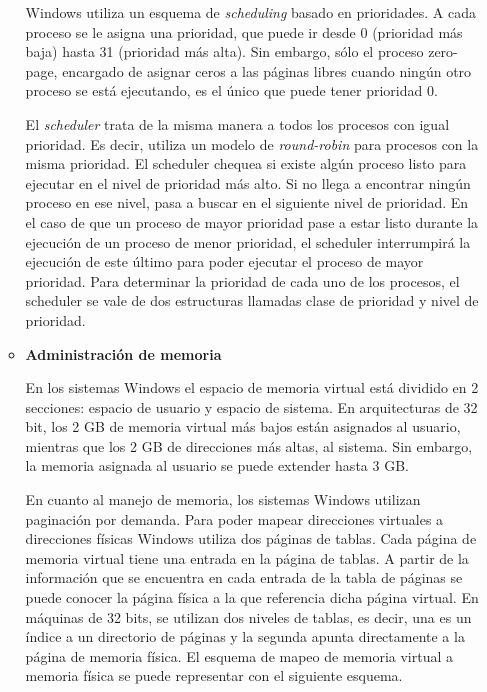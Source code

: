 \documentclass[a4paper,11pt] {article}
\begin{document}
\begin{itemize}
\begin{itemize}
		Windows utiliza un esquema de \textit{scheduling} basado en prioridades. A cada proceso se le asigna una prioridad, que puede ir desde 0 (prioridad más baja) hasta 31 (prioridad más alta). Sin embargo, sólo el proceso zero-page, encargado de asignar ceros a las páginas libres cuando ningún otro proceso se está ejecutando, es el único que puede tener prioridad 0.

		El \textit{scheduler} trata de la misma manera a todos los procesos con igual prioridad. Es decir, utiliza un modelo de \textit{round-robin} para procesos con la misma prioridad. El scheduler chequea si existe algún proceso listo para ejecutar en el nivel de prioridad más alto. Si no llega a encontrar ningún proceso en ese nivel, pasa a buscar en el siguiente nivel de prioridad. En el caso de que un proceso de mayor prioridad pase a estar listo durante la ejecución de un proceso de menor prioridad, el scheduler interrumpirá la ejecución de este último para poder ejecutar el proceso de mayor prioridad.
		Para determinar la prioridad de cada uno de los procesos, el scheduler se vale de dos estructuras llamadas clase de prioridad y nivel de prioridad.

		\item \textbf{Administración de memoria}

		En los sistemas Windows el espacio de memoria virtual está dividido en 2 secciones: espacio de usuario y espacio de sistema. En arquitecturas de 32 bit, los 2 GB de memoria virtual más bajos están asignados al usuario, mientras que los 2 GB de direcciones más altas, al sistema. Sin embargo, la memoria asignada al usuario se puede extender hasta 3 GB.
		
		En cuanto al manejo de memoria, los sistemas Windows utilizan paginación por demanda. Para poder mapear direcciones virtuales a direcciones físicas Windows utiliza dos páginas de tablas. Cada página de memoria virtual tiene una entrada en la página de tablas. A partir de la información que se encuentra en cada entrada de la tabla de páginas se puede conocer la página física a la que referencia dicha página virtual. En máquinas de 32 bits, se utilizan dos niveles de tablas, es decir, una es un índice a un directorio de páginas y la segunda apunta directamente a la página de memoria física. El esquema de mapeo de memoria virtual a memoria física se puede representar con el siguiente esquema.


\end{itemize}
\end{itemize}
\end{document}

